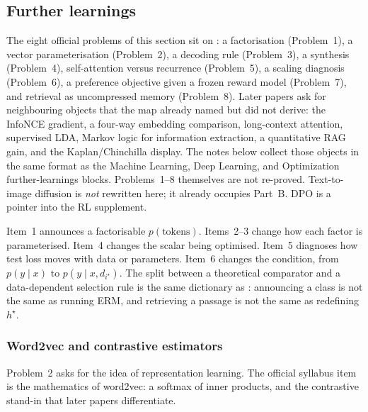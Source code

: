 \subsection{Further learnings}
\label{subsec:nlpu}

The eight official problems of this section sit on : a factorisation (Problem~1), a vector parameterisation (Problem~2), a decoding rule (Problem~3), a synthesis (Problem~4), self-attention versus recurrence (Problem~5), a scaling diagnosis (Problem~6), a preference objective given a frozen reward model (Problem~7), and retrieval as uncompressed memory (Problem~8). Later papers ask for neighbouring objects that the map already named but did not derive: the InfoNCE gradient, a four-way embedding comparison, long-context attention, supervised LDA, Markov logic for information extraction, a quantitative RAG gain, and the Kaplan/Chinchilla display. The notes below collect those objects in the same format as the Machine Learning, Deep Learning, and Optimization further-learnings blocks. Problems~1--8 themselves are not re-proved. Text-to-image diffusion is \emph{not} rewritten here; it already occupies Part~B. DPO is a pointer into the RL supplement.


\begin{remark}
\label{rem:nlpu-route}
Item~1 announces a factorisable $p(\text{tokens})$. Items~2--3 change how each factor is parameterised. Item~4 changes the scalar being optimised. Item~5 diagnoses how test loss moves with data or parameters. Item~6 changes the condition, from $p(y\mid x)$ to $p(y\mid x,d_{i^\star})$. The split between a theoretical comparator and a data-dependent selection rule is the same dictionary as : announcing a class is not the same as running ERM, and retrieving a passage is not the same as redefining $h^\star$.
\end{remark}


\subsubsection{Word2vec and contrastive estimators}
\label{subsubsec:nlpu-w2v}

Problem~2 asks for the idea of representation learning. The official syllabus item is the mathematics of word2vec: a softmax of inner products, and the contrastive stand-in that later papers differentiate.

